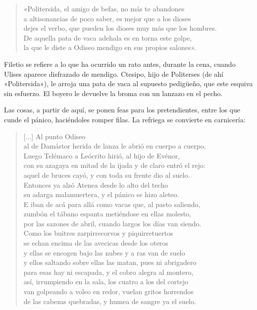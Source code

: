 \begin{verse}
«Politersida, el amigo de befas, no más te abandones\\
a altisonancias de poco saber, es mejor que a los dioses\\
dejes el verbo, que pueden los dioses muy más que los hombres.\\
De aquella pata de vaca adehala es en torna este golpe,\\
la que le diste a Odiseo mendigo en sus propios salones».
\end{verse}

Filetio se refiere a lo que ha ocurrido un rato antes, durante la cena, cuando Ulises aparece disfrazado de mendigo. Ctesipo, hijo de Politerses (de ahí «Politersida»), le arroja una pata de vaca al supuesto pedigüeño, que este esquiva sin esfuerzo. El boyero le devuelve la broma con un lanzazo en el pecho.

Las cosas, a partir de aquí, se ponen feas para los pretendientes, entre los que cunde el pánico, haciéndoles romper filas. La refriega se convierte en carnicería:

\begin{verse}
[...] Al punto Odiseo\\
al de Damástor herida de lanza le abrió en cuerpo a cuerpo.\\
Luego Telémaco a Leócrito hirió, al hijo de Evénor,\\
con su azagaya en mitad de la ijada y de claro entró el rejo:\\
aquel de bruces cayó, y con toda su frente dio al suelo.\\
Entonces ya alzó Atenea desde lo alto del techo\\
su adarga malamuertera, y el pánico se hizo aleteo.\\
E iban de acá para allá como vacas que, al pasto saliendo,\\
zumbón el tábano espanta metiéndose en ellas molesto,\\
por las sazones de abril, cuando largos los días van siendo.\\
Como los buitres zarpirrecorvos y piquirretuertos\\
se echan encima de las avecicas desde los oteros\\
y ellas se encogen bajo las nubes y a ras van de suelo\\
y ellos saltando sobre ellas las matan, pues ni abrigadero\\
para esas hay ni escapada, y el cobro alegra al montero,\\
así, irrumpiendo en la sala, los cuatro a los del cortejo\\
van golpeando a voleo en redor, vuelan gritos horrendos\\
de las cabezas quebradas, y humea de sangre ya el suelo.
\end{verse}

